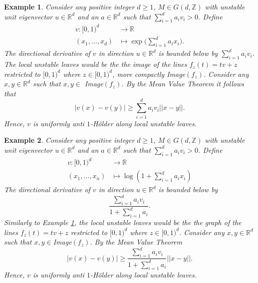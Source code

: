 \documentclass{amsart}
\newtheorem{example}{Example}
\newcommand{\RR}{\mathbb{R}}
\newcommand{\ZZ}{\mathbb{Z}}
\begin{document}
\begin{example}\label{ex.exp}
     Consider any positive integer $d\geq 1$, $M\in G(d,\ZZ)$ with unstable unit eigenvector $u\in \RR^d$ and an $a\in \RR^d$ such that $\sum_{i=1}^d a_iv_i > 0$. Define
     \begin{align*}
         v: [0,1)^d &\rightarrow \RR\\
         (x_1,\dots, x_d) &\mapsto \exp\Big(\sum_{i=1}^d a_ix_i\Big).
     \end{align*}
     The directional derivative of $v$ in direction $u\in\RR^d$ is bounded below by $\sum_{i=1}^d a_iv_i$. The local unstable leaves would be the the image of the lines $f_z(t) = tv + z$ restricted to $[0,1)^d$ where $z\in [0,1)^d$, more compactly Image$(f_z)$. Consider any $x,y \in \RR^d$ such that $x,y\in$ Image$(f_z)$. By the Mean Value Theorem it follows that
     \[|v(x) - v(y)|\geq \sum_{i=1}^d a_iv_i ||x-y||.\]
     Hence, $v$ is uniformly anti $1$-H\"older along local unstable leaves.
\end{example}

\begin{example}
     Consider any positive integer $d\geq 1$, $M\in G(d,\ZZ)$ with unstable unit eigenvector $u\in \RR^d$ and an $a\in \RR^d$ such that $\sum_{i=1}^d a_iv_i > 0$. Define
     \begin{align*}
         v: [0,1)^d &\rightarrow \RR\\
         (x_1,\dots, x_n) &\mapsto \log(1+\sum_{i=1}^d a_ix_i)
     \end{align*}
     The directional derivative of $v$ in direction $u\in\RR^d$ is bounded below by \[\frac{\sum_{i=1}^d a_iv_i}{1+\sum_{i=1}^d a_i}.\] 
     Similarly to Example \ref{ex.exp}, the local unstable leaves would be the the graph of the lines $f_z(t) = tv + z$ restricted to $[0,1)^d$ where $z\in [0,1)^d$. Consider any $x,y \in \RR^d$ such that $x,y\in $Image$(f_z)$. By the Mean Value Theorem
     \[|v(x) - v(y)|\geq \frac{\sum_{i=1}^d a_iv_i}{1+\sum_{i=1}^d a_i}||x-y||.\]
     Hence, $v$ is uniformly anti $1$-H\"older along local unstable leaves.
\end{example}
\end{document}
